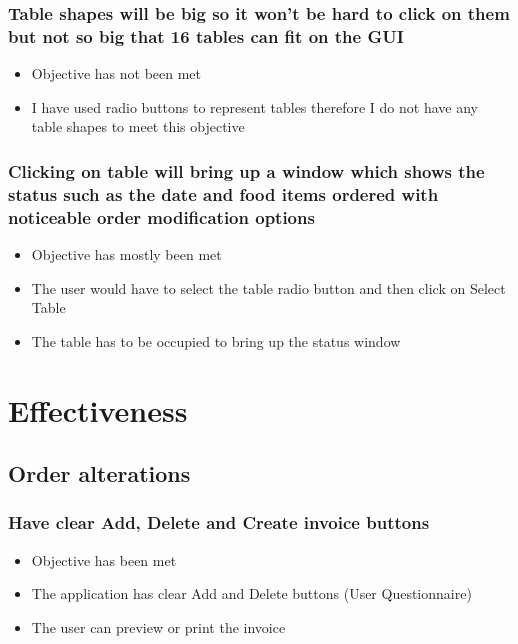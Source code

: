 \subsubsection{Table shapes will be big so it won't be hard to click on them but not so big that 16 tables can fit on the GUI}
\begin{itemize}
	\item Objective has not been met
	\item I have used radio buttons to represent tables therefore I do not have any table shapes to meet this objective

\end{itemize}

\subsubsection{Clicking on table will bring up a window which shows the status such as the date and food items ordered with noticeable order modification options}
\begin{itemize} 
	\item Objective has mostly been met
	\item The user would have to select the table radio button and then click on Select Table
	\item The table has to be occupied to bring up the status window

\end{itemize}

\section{Effectiveness}

\subsection{Order alterations}
\subsubsection{Have clear Add, Delete and Create invoice buttons}
\begin{itemize}
	\item Objective has been met
	\item The application has clear Add and Delete buttons (User Questionnaire)
	\item The user can preview or print the invoice
\end{itemize}

